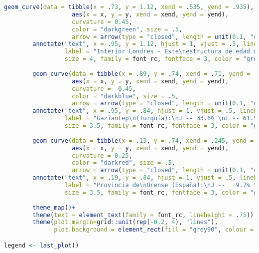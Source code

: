 \begin{lstlisting}[language=R, caption=C\'odigo 2 con la construcci\'on del mapa]
        geom_curve(data = tibble(x = .73, y = 1.12, xend = .535, yend = .935), 
                   aes(x = x, y = y, xend = xend, yend = yend),
                   curvature = 0.45,
                   color = "darkgreen", size = .5,
                   arrow = arrow(type = "closed", length = unit(0.1, "cm")))+
        annotate("text", x = .95, y = 1.12, hjust = 1, vjust = .5, lineheight = .9,
                 label = "Interior Londres - Este\nestructura de edad media:\nJovenes -- 18.4% \nEdad laboral -- 73.9% \nAncianos --   7.6%",
                 size = 4, family = font_rc, fontface = 3, color = "grey20")+
        
        geom_curve(data = tibble(x = .89, y = .74, xend = .71, yend = .735), 
                   aes(x = x, y = y, xend = xend, yend = yend),
                   curvature = -0.45,
                   color = "darkblue", size = .5,
                   arrow = arrow(type = "closed", length = unit(0.1, "cm")))+
        annotate("text", x = .95, y = .84, hjust = 1, vjust = .5, lineheight = .9,
                 label = "Gaziantep\n(Turquía):\nJ -- 33.6% \nL -- 61.5% \nM --   4.9%",
                 size = 3.5, family = font_rc, fontface = 3, color = "grey20")+
        
        geom_curve(data = tibble(x = .13, y = .74, xend = .245, yend = .71), 
                   aes(x = x, y = y, xend = xend, yend = yend),
                   curvature = 0.25,
                   color = "darkred", size = .5,
                   arrow = arrow(type = "closed", length = unit(0.1, "cm")))+
        annotate("text", x = .19, y = .84, hjust = 1, vjust = .5, lineheight = .9,
                 label = "Provincia de\nOrense (España):\nJ --   9.7% \nL -- 59.9% \nM -- 30.4%",
                 size = 3.5, family = font_rc, fontface = 3, color = "grey20")+
        
        theme_map()+
        theme(text = element_text(family = font_rc, lineheight = .75)) % +replace%
        theme(plot.margin=grid::unit(rep(-0.2, 4), "lines"),
              plot.background = element_rect(fill = "grey90", colour = "grey20"))

legend <- last_plot()


\end{lstlisting}
